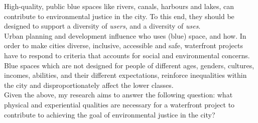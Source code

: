 \documentclass{article}
\begin{document}

High-quality, public blue spaces like rivers, canals, harbours and lakes, can contribute to environmental justice in the city.
To this end, they should be designed to support a diversity of \textit{users}, and a diversity of \textit{uses}.\\
Urban planning and development influence who uses (blue) space, and how.
In order to make cities diverse, inclusive, accessible and safe, waterfront projects have to respond to criteria that accounts for social and environmental concerns.\\
Blue spaces which are not designed for people of different ages, genders, cultures, incomes, abilities, and their different expectations, reinforce inequalities within the city and disproportionately affect the lower classes.\\

Given the above, my research aims to answer the following question: 
what physical and experiential qualities are necessary for a waterfront project to contribute to achieving the goal of environmental justice in the city?


\pagebreak

\printbibliography
\end{document}
